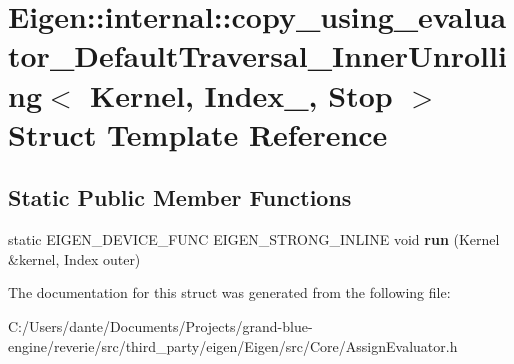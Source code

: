 \hypertarget{struct_eigen_1_1internal_1_1copy__using__evaluator___default_traversal___inner_unrolling}{}\section{Eigen\+::internal\+::copy\+\_\+using\+\_\+evaluator\+\_\+\+Default\+Traversal\+\_\+\+Inner\+Unrolling$<$ Kernel, Index\+\_\+, Stop $>$ Struct Template Reference}
\label{struct_eigen_1_1internal_1_1copy__using__evaluator___default_traversal___inner_unrolling}
\subsection*{Static Public Member Functions}
\begin{DoxyCompactItemize}
\item 
\mbox{\label{struct_eigen_1_1internal_1_1copy__using__evaluator___default_traversal___inner_unrolling_a4a3241ab24ef97eec46891b1488eb31e}} 
static E\+I\+G\+E\+N\+\_\+\+D\+E\+V\+I\+C\+E\+\_\+\+F\+U\+NC E\+I\+G\+E\+N\+\_\+\+S\+T\+R\+O\+N\+G\+\_\+\+I\+N\+L\+I\+NE void {\bfseries run} (Kernel \&kernel, Index outer)
\end{DoxyCompactItemize}


The documentation for this struct was generated from the following file\+:\begin{DoxyCompactItemize}
\item 
C\+:/\+Users/dante/\+Documents/\+Projects/grand-\/blue-\/engine/reverie/src/third\+\_\+party/eigen/\+Eigen/src/\+Core/Assign\+Evaluator.\+h\end{DoxyCompactItemize}

